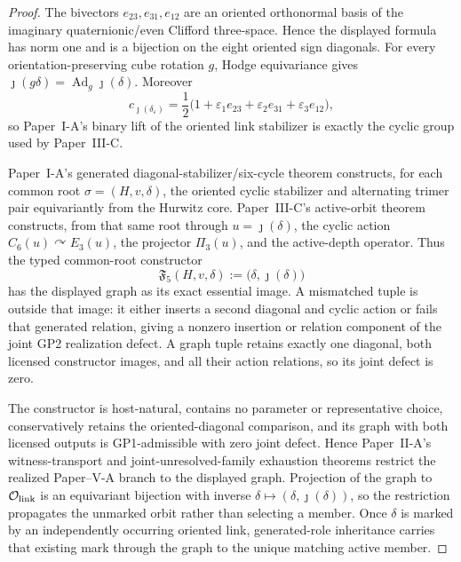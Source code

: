 \documentclass[12pt,a4paper]{article}
\begin{document}
\begin{proof}
The bivectors \(e_{23},e_{31},e_{12}\) are an oriented orthonormal basis of
the imaginary quaternionic/even Clifford three-space.  Hence the displayed
formula has norm one and is a bijection on the eight oriented sign diagonals.
For every orientation-preserving cube rotation \(g\), Hodge equivariance gives
\(\jmath(g\delta)=\operatorname{Ad}_g\jmath(\delta)\).  Moreover
\[
 c_{\jmath(\delta_\varepsilon)}
 =\frac12\bigl(1+\varepsilon_1e_{23}+\varepsilon_2e_{31}
                    +\varepsilon_3e_{12}\bigr),
\]
so Paper~I-A's binary lift of the oriented link stabilizer is exactly the cyclic
group used by Paper~III-C.

Paper~I-A's generated diagonal-stabilizer/six-cycle theorem constructs, for
each common root \(\sigma=(H,v,\delta)\), the oriented cyclic stabilizer and
alternating trimer pair equivariantly from the Hurwitz core.  Paper~III-C's
active-orbit theorem constructs, from that same root through
\(u=\jmath(\delta)\), the cyclic action
\(C_6(u)\curvearrowright E_3(u)\), the projector \(\Pi_3(u)\), and the
active-depth operator.  Thus the typed common-root constructor
\[
 \mathfrak F_5(H,v,\delta)
 :=\bigl(\delta,\jmath(\delta)\bigr)
\]
has the displayed graph as its exact essential image.  A mismatched tuple is
outside that image: it either inserts a second diagonal
and cyclic action or fails that generated relation, giving a nonzero insertion
or relation component of the joint GP2 realization defect.  A graph tuple
retains exactly one diagonal, both licensed constructor images, and all their
action relations, so its joint defect is zero.

The constructor is host-natural, contains no parameter or representative
choice, conservatively retains the oriented-diagonal comparison, and its graph
with both licensed outputs is GP1-admissible with zero joint defect.  Hence
Paper~II-A's witness-transport and joint-unresolved-family exhaustion theorems
restrict the realized Paper--V-A branch to the displayed graph.  Projection of the graph to
\(\mathcal O_{\rm link}\) is an equivariant bijection with inverse
\(\delta\mapsto(\delta,\jmath(\delta))\), so the restriction propagates the
unmarked orbit rather than selecting a member.  Once \(\delta\) is marked by
an independently occurring oriented link, generated-role inheritance carries
that existing mark through the graph to the unique matching active member.
\end{proof}
\end{document}

